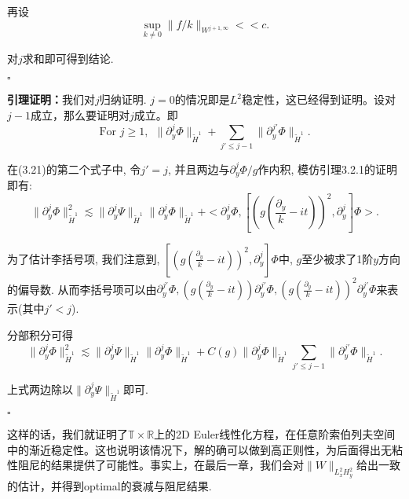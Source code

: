 再设$$\sup_{k\neq 0}\|f/k\|_{W^{j+1,\infty}}<<c.$$

对$j$求和即可得到结论.
\begin{flushright}
$\square$
\end{flushright}

\textbf{引理证明：}我们对$j$归纳证明. $j=0$的情况即是$L^2$稳定性，这已经得到证明。设对$j-1$成立，那么要证明对$j$成立。即
\begin{equation}
\text{For }j\geq 1,~~\|\partial_y^j\Phi\|_{\tilde{H}^1}+\sum_{j'\leq j-1}\|\partial_y^{j'}\Phi\|_{\tilde{H}^1}.
\end{equation}

在(3.21)的第二个式子中, 令$j'=j$, 并且两边与$\partial_y^j\Phi/g$作内积, 模仿引理3.2.1的证明即有:
\begin{equation}
\|\partial_y^j\Phi\|_{\tilde{H}^1}^2\lesssim \|\partial_y^j\Psi\|_{\tilde{H}^1}\|\partial_y^j\Phi\|_{\tilde{H}^1}+<\partial_y^j\Phi,[(g(\frac{\partial_y}{k}-it))^2,\partial_{y}^{j}]\Phi>.
\end{equation}

为了估计李括号项, 我们注意到, $[(g(\frac{\partial_y}{k}-it))^2,\partial_{y}^{j}]\Phi$中, $g$至少被求了1阶$y$方向的偏导数. 从而李括号项可以由$\partial_y^{j'}\Phi,(g(\frac{\partial_y}{k}-it))\partial_y^{j'}\Phi,(g(\frac{\partial_y}{k}-it))^2\partial_y^{j'}\Phi$来表示(其中$j'<j$).

分部积分可得
\begin{equation}
\|\partial_y^j\Phi\|_{\tilde{H}^1}^2\lesssim \|\partial_y^j\Psi\|_{\tilde{H}^1}\|\partial_y^j\Phi\|_{\tilde{H}^1}+C(g)\|\partial_y^j \Phi\|_{\tilde{H}^1}\sum_{j'\leq j-1}\|\partial_y^{j'}\Phi\|_{\tilde{H}^1}.
\end{equation}

上式两边除以$\|\partial_y^j\Psi\|_{\tilde{H}^1}$即可.

\begin{flushright}
$\square$
\end{flushright}

这样的话，我们就证明了$\mathbb{T}\times\mathbb{R}$上的2D Euler线性化方程，在任意阶索伯列夫空间中的渐近稳定性。这也说明该情况下，解的确可以做到高正则性，为后面得出无粘性阻尼的结果提供了可能性。事实上，在最后一章，我们会对$\|W\|_{L_x^2H_y^2}$给出一致的估计，并得到optimal的衰减与阻尼结果. 